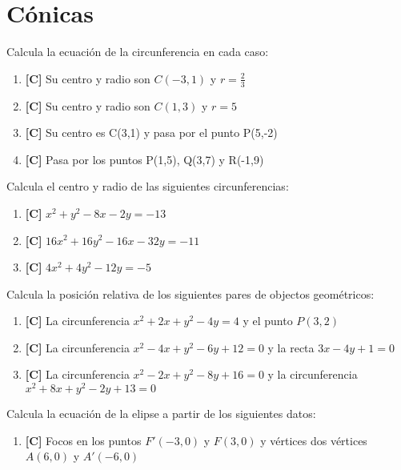 \chapter{Cónicas}
\setcounter{exercicio}{0}

\Exercicio Calcula la ecuación de la circunferencia en cada caso:

\begin{enumerate}[topsep=0pt]
	\item \textbf{[C]} Su centro y radio son $C(-3,1)$ y $r = \frac{2}{3}$
	\item \textbf{[C]} Su centro y radio son $C(1,3)$ y $r=5$
	\item \textbf{[C]} Su centro es C(3,1) y pasa por el punto P(5,-2)
	\item \textbf{[C]} Pasa por los puntos P(1,5), Q(3,7) y R(-1,9)
\end{enumerate}


\Exercicio Calcula el centro y radio de las siguientes circunferencias:

\begin{enumerate}[topsep=0pt]
	\item \textbf{[C]} $x^2+y^2 -8x -2y = -13$
	\item \textbf{[C]} $16x^2 + 16y^2 -16x -32y = -11 $
	\item \textbf{[C]} $4x^2 + 4y^2 -12y = -5$
\end{enumerate}


\Exercicio Calcula la posición relativa de los siguientes pares de objectos geométricos:

\begin{enumerate}[topsep=0pt]
	\item \textbf{[C]} La circunferencia $x^2+2x+y^2-4y=4$ y el punto $P(3,2)$
	\item \textbf{[C]} La circunferencia $x^2-4x+y^2 - 6y +12 = 0$ y la recta $ 3x - 4y + 1 = 0$
	\item \textbf{[C]} La circunferencia $x^2 -2x + y^2 -8y +16 = 0$ y la circunferencia $x^2 + 8x + y^2 - 2y + 13=0$
\end{enumerate}


\Exercicio Calcula la ecuación de la elipse a partir de los siguientes datos:

\begin{enumerate}[topsep=0pt]
	\item \textbf{[C]} Focos en los puntos $F'(-3,0)$ y $F(3,0)$ y vértices dos vértices $A(6,0)$ y $A'(-6,0)$
\end{enumerate}

